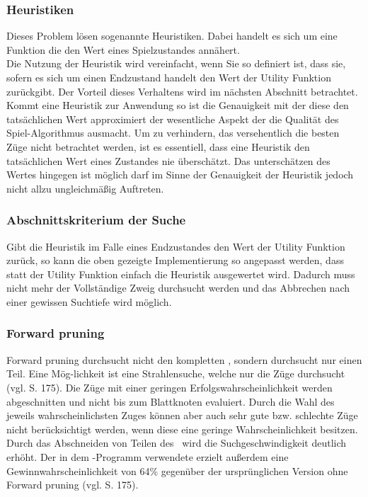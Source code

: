 \subsubsection{Heuristiken}
Dieses Problem lösen sogenannte Heuristiken. Dabei handelt es sich um eine Funktion die den Wert eines Spielzustandes annähert.
\\Die Nutzung der Heuristik wird vereinfacht, wenn Sie so definiert ist, dass sie, sofern es sich um einen Endzustand handelt den Wert der Utility Funktion zurückgibt. Der Vorteil dieses Verhaltens wird im nächsten Abschnitt betrachtet.\\
Kommt eine Heuristik zur Anwendung so ist die Genauigkeit mit der diese den tatsächlichen Wert approximiert der wesentliche Aspekt der die Qualität des Spiel-Algorithmus ausmacht. Um zu verhindern, das versehentlich die besten Züge nicht betrachtet werden, ist es essentiell, dass eine Heuristik den tatsächlichen Wert eines Zustandes nie überschätzt. Das unterschätzen des Wertes hingegen ist möglich darf im Sinne der Genauigkeit der Heuristik jedoch nicht allzu ungleichmäßig Auftreten.

\subsubsection{Abschnittskriterium der Suche}
Gibt die Heuristik im Falle eines Endzustandes den Wert der Utility Funktion zurück, so kann die oben gezeigte Implementierung so angepasst werden, dass statt der Utility Funktion einfach die Heuristik ausgewertet wird. Dadurch muss nicht mehr der Vollständige Zweig durchsucht werden und das Abbrechen nach einer gewissen Suchtiefe wird möglich.
 
\subsubsection{Forward pruning}
Forward pruning durchsucht nicht den kompletten \gtree , sondern durchsucht nur einen Teil. Eine Mög-lichkeit ist eine Strahlensuche, welche nur die  Züge durchsucht (vgl. \cite{Russell.2016} S. 175). Die Züge mit einer geringen Erfolgswahrscheinlichkeit werden abgeschnitten und nicht bis zum Blattknoten evaluiert. Durch die Wahl des jeweils wahrscheinlichsten Zuges können aber auch sehr gute bzw. schlechte Züge nicht berücksichtigt werden, wenn diese eine geringe Wahrscheinlichkeit besitzen. Durch das Abschneiden von Teilen des \gtree\ wird die Suchgeschwindigkeit deutlich erhöht. Der in dem \ot -Programm  verwendete  erzielt außerdem eine Gewinnwahrscheinlichkeit von 64\% gegenüber der ursprünglichen Version ohne Forward pruning (vgl. \cite{Russell.2016} S. 175).
